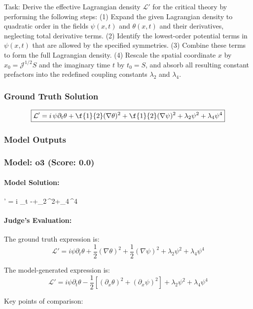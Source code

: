 \documentclass[10pt]{article}
\begin{document}
Task:
Derive the effective Lagrangian density $\mathcal{L}'$ for the critical theory by performing the following steps: (1) Expand the given Lagrangian density to quadratic order in the fields $\psi(x,t)$ and $\theta(x,t)$ and their derivatives, neglecting total derivative terms. (2) Identify the lowest-order potential terms in $\psi(x,t)$ that are allowed by the specified symmetries. (3) Combine these terms to form the full Lagrangian density. (4) Rescale the spatial coordinate $x$ by $x_0 = \mathcal{J}^{1/2}S$ and the imaginary time $t$ by $t_0 = S$, and absorb all resulting constant prefactors into the redefined coupling constants $\lambda_2$ and $\lambda_4$.

\subsubsection*{Ground Truth Solution}
\[ \boxed{\mathcal{L}'=
 i  \, \psi \partial_t \theta
+  \f{1}{2}
(\nabla\theta)^2 
+  \f{1}{2}
(\nabla \psi)^2 
 + \lambda_2 \psi^2 
+  \lambda_4 \psi^4} \]

\subsubsection*{Model Outputs}
\subsubsection*{Model: o3 (Score: 0.0)}
\paragraph*{Model Solution:}
\;
' \;=\;
i\,\psi\,\partial_{t}\theta
\;-\;\!
\;+\;\lambda_{2}\,\psi^{2}\;+\;\lambda_{4}\,\psi^{4}\;

\paragraph*{Judge's Evaluation:}

The ground truth expression is:
\[
\mathcal{L}' = i \psi \partial_t \theta + \frac{1}{2} (\nabla \theta)^2 + \frac{1}{2} (\nabla \psi)^2 + \lambda_2 \psi^2 + \lambda_4 \psi^4
\]

The model-generated expression is:
\[
\mathcal{L}' = i \psi \partial_t \theta - \frac{1}{2} \left[ (\partial_x \theta)^2 + (\partial_x \psi)^2 \right] + \lambda_2 \psi^2 + \lambda_4 \psi^4
\]

Key points of comparison:
\end{document}
